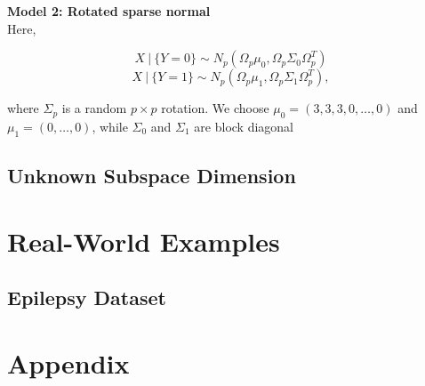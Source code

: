 \documentclass[12pt]{article}
\begin{document}


\noindent\textbf{Model 2: Rotated sparse normal}\\
Here,

\[X \ | \ \{Y = 0\} \sim N_p(\Omega_p\mu_0, \Omega_p \Sigma_0 \Omega_p^T)  \] 
\[X \ | \ \{Y = 1\} \sim N_p(\Omega_p\mu_1, \Omega_p\Sigma_1\Omega_p^T),  \]

where $\Sigma_p$ is a random $p\times p$ rotation. We choose $\mu_0 = (3, 3, 3, 0, \ldots, 0)$ and $\mu_1 = (0, \ldots, 0)$, while $\Sigma_0$ and $\Sigma_1$ are block diagonal




\subsection{Unknown Subspace Dimension}


\section{Real-World Examples}


\subsection{Epilepsy Dataset}


\section*{Appendix}




\end{document}

